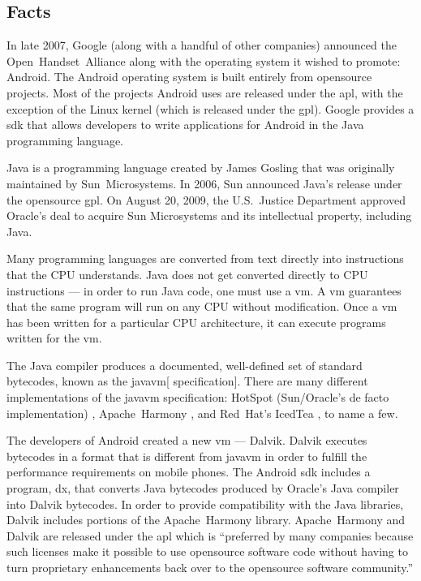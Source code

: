 \documentclass[11pt]{article}
\begin{document}
\begin{multicols}{2}
\setcounter{page}{1}

\section{Facts} %
\label{sec:facts}

In late 2007, Google (along with a handful of other companies) announced the
Open~Handset~Alliance \cite{open-handset-alliance-ann} along with the operating
system it wished to promote: Android.  The Android operating system is built
entirely from \gls{opensource} projects.  Most of the projects Android uses are
released under the \gls{apl}, with the exception of the Linux kernel (which is
released under the \gls{gpl}).  Google provides a \gls{sdk} that allows
developers to write applications for Android in the Java programming language.

Java is a programming language created by James Gosling that was originally
maintained by Sun~Microsystems.  In 2006, Sun announced Java's release under the
\gls{opensource} \gls{gpl}. \cite{sun-open-sources-java} On August 20, 2009, the
U.S.~Justice Department approved Oracle's deal to acquire Sun Microsystems and
its intellectual property, including Java. \cite{oracle-buys-sun}

Many programming languages are converted from text directly into instructions
that the CPU understands.  Java does not get converted directly to CPU
instructions --- in order to run Java code, one must use a \gls{vm}.  A \gls{vm}
guarantees that the same program will run on any CPU without modification.  Once
a \gls{vm} has been written for a particular CPU architecture, it can execute
programs written for the \gls{vm}.

The Java compiler produces a documented, well-defined set of standard
\glspl{bytecode}, known as the \gls{javavm}[ specification]. \cite[Chapter
4]{javavm-bytecode}  There are many different implementations of the
\gls{javavm} specification: HotSpot (Sun/Oracle's de facto implementation)
\cite{hotspot}, Apache~Harmony \cite{apache-harmony}, and Red~Hat's IcedTea
\cite{icedtea}, to name a few.

The developers of Android created a new \gls{vm} --- Dalvik.  Dalvik executes
\glspl{bytecode} in a format that is different from \gls{javavm} in order to
fulfill the performance requirements on mobile phones.  \cite{dalvik-bytecode}
\cite{dalvik-vm-arch} The Android \gls{sdk} includes a program, dx, that
converts Java \glspl{bytecode} produced by Oracle's Java compiler into Dalvik
\glspl{bytecode}.  \cite{android-sdk-building} In order to provide compatibility
with the Java libraries, Dalvik includes portions of the Apache~Harmony library.
\cite{apache-harmony} \cite{dalvik-readme}  Apache~Harmony and Dalvik are
released under the \gls{apl} \cite{apache-license} which is ``preferred by many
companies because such licenses make it possible to use \gls{opensource}
software code without having to turn proprietary enhancements back over to the
\gls{opensource} software community.'' \cite{why-apache2-license}


\end{multicols}
\end{document}
